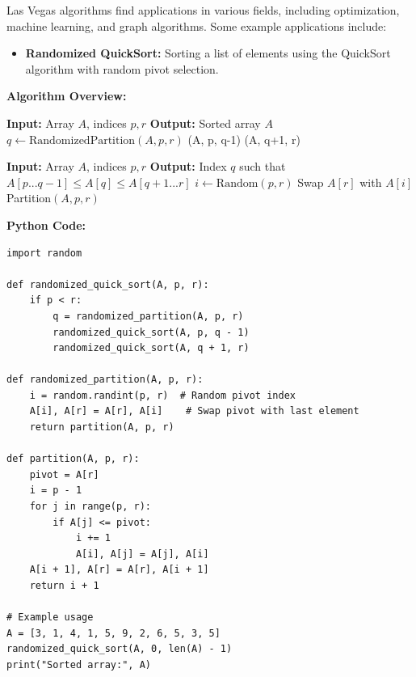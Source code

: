 \documentclass[12pt]{book} %
\begin{document}
Las Vegas algorithms find applications in various fields, including optimization, machine learning, and graph algorithms. Some example applications include:
\begin{itemize}
    \item \textbf{Randomized QuickSort:} Sorting a list of elements using the QuickSort algorithm with random pivot selection.
\end{itemize}
\textbf{Algorithm Overview:}
\FloatBarrier
\begin{algorithm}
\caption{Randomized QuickSort}
\begin{algorithmic}[1]
\State \textbf{Input:} Array $A$, indices $p, r$
\State \textbf{Output:} Sorted array $A$
    \State $q \leftarrow \text{RandomizedPartition}(A, p, r)$
    \State {}(A, p, q-1)
    \State {}(A, q+1, r)
\EndIf
\end{algorithmic}
\end{algorithm}

\begin{algorithm}
\caption{Randomized Partition}
\begin{algorithmic}[1]
\State \textbf{Input:} Array $A$, indices $p, r$
\State \textbf{Output:} Index $q$ such that $A[p...q-1] \leq A[q] \leq A[q+1...r]$
\State $i \leftarrow \text{Random}(p, r)$ 
\State Swap $A[r]$ with $A[i]$
\Return Partition$(A, p, r)$
\end{algorithmic}
\end{algorithm}
\FloatBarrier
\textbf{Python Code:}
\FloatBarrier
\begin{lstlisting}
import random

def randomized_quick_sort(A, p, r):
    if p < r:
        q = randomized_partition(A, p, r)
        randomized_quick_sort(A, p, q - 1)
        randomized_quick_sort(A, q + 1, r)

def randomized_partition(A, p, r):
    i = random.randint(p, r)  # Random pivot index
    A[i], A[r] = A[r], A[i]    # Swap pivot with last element
    return partition(A, p, r)

def partition(A, p, r):
    pivot = A[r]
    i = p - 1
    for j in range(p, r):
        if A[j] <= pivot:
            i += 1
            A[i], A[j] = A[j], A[i]
    A[i + 1], A[r] = A[r], A[i + 1]
    return i + 1

# Example usage
A = [3, 1, 4, 1, 5, 9, 2, 6, 5, 3, 5]
randomized_quick_sort(A, 0, len(A) - 1)
print("Sorted array:", A)
\end{lstlisting}
\end{document}
